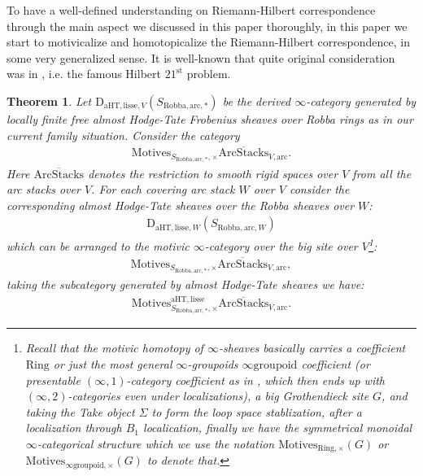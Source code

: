 \documentclass[12pt]{article}
\newtheorem{theorem}{Theorem}
\theoremstyle{definition}
\begin{document}
\indent To have a well-defined understanding on Riemann-Hilbert correspondence through the main aspect we discussed in this paper thoroughly, in this paper we start to motivicalize and homotopicalize the Riemann-Hilbert correspondence, in some very generalized sense. It is well-known that quite original consideration was in \cite{5H}, i.e. the famous Hilbert $21^\mathrm{st}$ problem.
\begin{theorem}
Let $\mathrm{D}_{\mathrm{aHT},\mathrm{lisse},V}(S_{\mathrm{Robba},\mathrm{arc},*})$ be the derived $\infty$-category generated by locally finite free almost Hodge-Tate Frobenius sheaves over Robba rings as in our current family situation. Consider the category 
\begin{align}
\mathrm{Motives}_{S_{\mathrm{Robba},\mathrm{arc},*},\times}\overline{\mathrm{ArcStacks}}_{V,\mathrm{arc}}.
\end{align}
Here $\overline{\mathrm{ArcStacks}}$ denotes the restriction to smooth rigid spaces over $V$ from all the arc stacks over $V$. For each covering arc stack $W$ over $V$ consider the corresponding almost Hodge-Tate sheaves over the Robba sheaves over $W$:
\begin{align}
\mathrm{D}_{\mathrm{aHT},\mathrm{lisse},W}(S_{\mathrm{Robba},\mathrm{arc},W})
\end{align}
which can be arranged to the motivic $\infty$-category over the big site over $V$\footnote{Recall that the motivic homotopy of $\infty$-sheaves basically carries a coefficient $\mathrm{Ring}$ or just the most general $\infty$-groupoids $\infty\mathrm{groupoid}$ coefficient (or \textit{presentable $(\infty,1)$-category coefficient} as in \cite{5S4}, which then ends up with $(\infty,2)$-categories even under localizations), a big Grothendieck site $G$, and taking the Take object $\Sigma$ to form the loop space stablization, after a localization through $B_1$ localication, finally we have the symmetrical monoidal $\infty$-categorical structure which we use the notation $\mathrm{Motives}_{\mathrm{Ring},\times}(G)$ or $\mathrm{Motives}_{\infty\mathrm{groupoid},\times}(G)$ to denote that.}:
\begin{align}
\mathrm{Motives}_{S_{\mathrm{Robba},\mathrm{arc},*},\times}\overline{\mathrm{ArcStacks}}_{V,\mathrm{arc}},
\end{align}
taking the subcategory generated by almost Hodge-Tate sheaves we have:
\begin{align}
\mathrm{Motives}^{\mathrm{aHT},\mathrm{lisse}}_{S_{\mathrm{Robba},\mathrm{arc},*},\times}\overline{\mathrm{ArcStacks}}_{V,\mathrm{arc}}.

\end{align}
\end{theorem}
\end{document}
